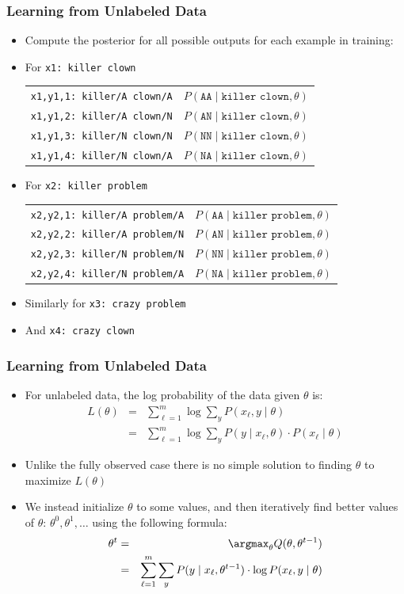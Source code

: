 \begin{frame}
\frametitle{Learning from Unlabeled Data}
\begin{itemize}[<+->]
\item Compute the posterior for all possible outputs for each example in training:
\item For {\tt x1: killer clown} \pause
{\small\begin{tabular}{ll}
{\tt x1,y1,1: killer/A clown/A} & $P(\texttt{AA} \mid \texttt{killer clown}, \theta)$ \pause \\
{\tt x1,y1,2: killer/A clown/N} & $P(\texttt{AN} \mid \texttt{killer clown}, \theta)$ \pause \\
{\tt x1,y1,3: killer/N clown/N} & $P(\texttt{NN} \mid \texttt{killer clown}, \theta)$ \pause \\
{\tt x1,y1,4: killer/N clown/A} & $P(\texttt{NA} \mid \texttt{killer clown}, \theta)$
\end{tabular}}
\item For {\tt x2: killer problem}
{\small\begin{tabular}{ll}
{\tt x2,y2,1: killer/A problem/A} & $P(\texttt{AA} \mid \texttt{killer problem}, \theta)$ \\
{\tt x2,y2,2: killer/A problem/N} & $P(\texttt{AN} \mid \texttt{killer problem}, \theta)$\\
{\tt x2,y2,3: killer/N problem/N} & $P(\texttt{NN} \mid \texttt{killer problem}, \theta)$\\
{\tt x2,y2,4: killer/N problem/A} & $P(\texttt{NA} \mid \texttt{killer problem}, \theta)$
\end{tabular}}
\item Similarly for {\tt x3: crazy problem} 
\item And {\tt x4: crazy clown}
\end{itemize}
\end{frame}


\begin{frame}
\frametitle{Learning from Unlabeled Data}
\begin{itemize}[<+->]
\item For unlabeled data, the log probability of the data given $\theta$ is:
\begin{eqnarray*}
 L(\theta) &=& \sum_{\ell=1}^m \log \sum_y P(x_\ell,y \mid \theta) \\
 &=& \sum_{\ell=1}^m \log \sum_y P(y \mid x_\ell, \theta) \cdot P(x_\ell \mid \theta)
 \end{eqnarray*}
\item Unlike the fully observed case there is no simple solution to finding $\theta$ to maximize $L(\theta)$
\item We instead initialize $\theta$ to some values, and then iteratively find better values of $\theta$: $\theta^0, \theta^1, \ldots$ using the following formula:
\begin{eqnarray*}
\theta^t &=& \argmax_\theta Q(\theta, \theta^{t-1})\\
&=& \sum_{\ell=1}^m \sum_y P(y \mid x_\ell, \theta^{t-1}) \cdot \log P(x_\ell, y \mid \theta) 
\end{eqnarray*}
\end{itemize}
\end{frame}

